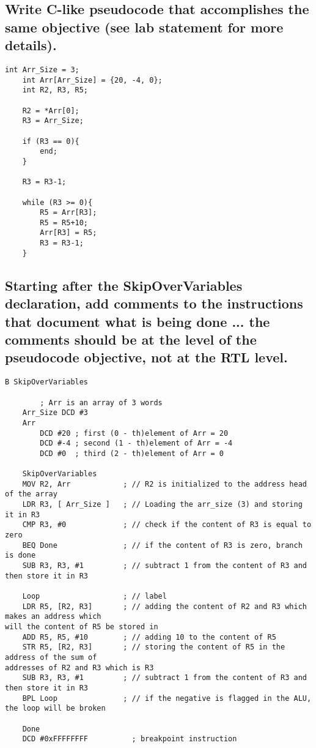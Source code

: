 \documentclass{article}
\begin{document}
	\subsection{Write C-like pseudocode that accomplishes the same objective (see lab statement for more details).}
	
	\begin{lstlisting}[style=CStyle]
	int Arr_Size = 3;
	int Arr[Arr_Size] = {20, -4, 0};
	int R2, R3, R5;
	
	R2 = *Arr[0];
	R3 = Arr_Size;
	
	if (R3 == 0){
		end;
	}
	
	R3 = R3-1;
	
	while (R3 >= 0){
		R5 = Arr[R3];
		R5 = R5+10;
		Arr[R3] = R5;
		R3 = R3-1;
	}	\end{lstlisting}
	
	\pagebreak
	
	\subsection{Starting after the SkipOverVariables declaration, add comments to the instructions that document what is being done ... the comments should be at the level of the pseudocode objective, not at the RTL level.}
	
	\begin{lstlisting}[style=CStyle]
	B SkipOverVariables
	
		; Arr is an array of 3 words
	Arr_Size DCD #3
	Arr
		DCD #20 ; first (0 - th)element of Arr = 20
		DCD #-4 ; second (1 - th)element of Arr = -4
		DCD #0  ; third (2 - th)element of Arr = 0
	
	SkipOverVariables
	MOV R2, Arr            ; // R2 is initialized to the address head of the array
	LDR R3, [ Arr_Size ]   ; // Loading the arr_size (3) and storing it in R3
	CMP R3, #0             ; // check if the content of R3 is equal to zero
	BEQ Done               ; // if the content of R3 is zero, branch is done
	SUB R3, R3, #1         ; // subtract 1 from the content of R3 and then store it in R3

	Loop                   ; // label
	LDR R5, [R2, R3]       ; // adding the content of R2 and R3 which makes an address which 														will the content of R5 be stored in
	ADD R5, R5, #10        ; // adding 10 to the content of R5
	STR R5, [R2, R3]       ; // storing the content of R5 in the address of the sum of 																	addresses of R2 and R3 which is R3
	SUB R3, R3, #1         ; // subtract 1 from the content of R3 and then store it in R3
	BPL Loop               ; // if the negative is flagged in the ALU, the loop will be broken 

	Done
	DCD #0xFFFFFFFF 	  	 ; breakpoint instruction	\end{lstlisting}
	
\end{document}
